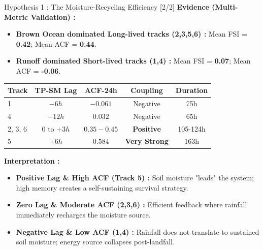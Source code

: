 \begin{frame}{Hypothesis 1 : The Moisture-Recycling Efficiency [2/2]}
	\footnotesize
	\textbf{Evidence (Multi-Metric Validation) :}
	\begin{itemize}
		\item \textbf{Brown Ocean dominated Long-lived tracks (2,3,5,6) :} Mean FSI = \textbf{0.42}; Mean ACF = \textbf{0.44}.
		\item \textbf{Runoff dominated Short-lived tracks (1,4) :} Mean FSI = \textbf{0.07}; Mean ACF = \textbf{-0.06}.
	\end{itemize}

	\vspace{0.1cm}
	\begin{center}
		\begin{tabular}{lcccc}
			\toprule
			\textbf{Track} & \textbf{TP-SM Lag} & \textbf{ACF-24h} & \textbf{Coupling}    & \textbf{Duration} \\
			\midrule
			1              & $-6h$              & $-0.061$         & Negative             & 75h               \\
			4              & $-12h$             & $0.032$          & Negative             & 65h               \\
			2, 3, 6        & $0$ to $+3h$       & $0.35-0.45$      & \textbf{Positive}    & 105-124h          \\
			5              & $+6h$              & $0.584$          & \textbf{Very Strong} & 163h              \\
			\bottomrule
		\end{tabular}
	\end{center}

	\vspace{0.1cm}
	\footnotesize
	\textbf{Interpretation :}
	\begin{itemize}
		\item \textbf{Positive Lag \& High ACF (Track 5) :} Soil moisture "leads" the system; high memory creates a self-sustaining survival strategy.
		\item \textbf{Zero Lag \& Moderate ACF (2,3,6) :} Efficient feedback where rainfall immediately recharges the moisture source.  \cite{osuri2020}
		\item \textbf{Negative Lag \& Low ACF (1,4) :} Rainfall does not translate to sustained soil moisture; energy source collapses post-landfall.
	\end{itemize}
\end{frame}

